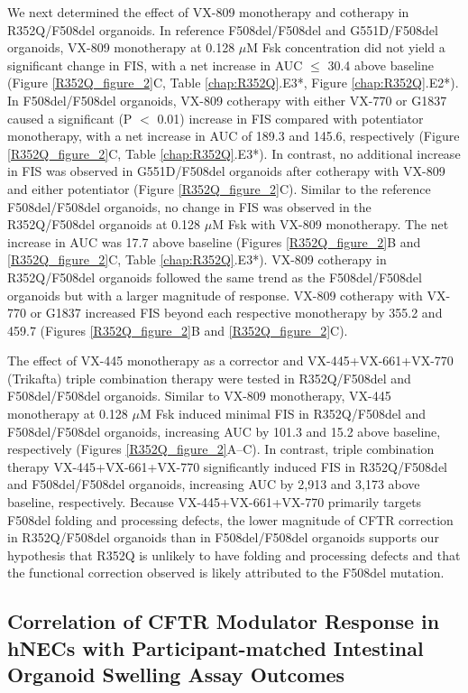 We next determined the effect of VX-809 monotherapy and cotherapy in R352Q/F508del organoids. In reference F508del/F508del and G551D/F508del organoids, VX-809 monotherapy at 0.128 $\mu$M Fsk concentration did not yield a significant change in FIS, with a net increase in AUC $\leq$ 30.4 above baseline (Figure \ref{R352Q_figure_2}C, Table \ref{chap:R352Q}.E3*, Figure \ref{chap:R352Q}.E2*). In F508del/F508del organoids, VX-809 cotherapy with either VX-770 or G1837 caused a significant (P $<$ 0.01) increase in FIS compared with potentiator monotherapy, with a net increase in AUC of 189.3 and 145.6, respectively (Figure \ref{R352Q_figure_2}C, Table \ref{chap:R352Q}.E3*). In contrast, no additional increase in FIS was observed in G551D/F508del organoids after cotherapy with VX-809 and either potentiator (Figure \ref{R352Q_figure_2}C). Similar to the reference F508del/F508del organoids, no change in FIS was observed in the R352Q/F508del organoids at 0.128 $\mu$M Fsk with VX-809 monotherapy. The net increase in AUC was 17.7 above baseline (Figures \ref{R352Q_figure_2}B and \ref{R352Q_figure_2}C, Table \ref{chap:R352Q}.E3*). VX-809 cotherapy in R352Q/F508del organoids followed the same trend as the F508del/F508del organoids but with a larger magnitude of response. VX-809 cotherapy with VX-770 or G1837 increased FIS beyond each respective monotherapy by 355.2 and 459.7 (Figures \ref{R352Q_figure_2}B and \ref{R352Q_figure_2}C).

The effect of VX-445 monotherapy as a corrector and VX-445+VX-661+VX-770 (Trikafta) triple combination therapy were tested in R352Q/F508del and F508del/F508del organoids. Similar to VX-809 monotherapy, VX-445 monotherapy at 0.128 $\mu$M Fsk induced minimal FIS in R352Q/F508del and F508del/F508del organoids, increasing AUC by 101.3 and 15.2 above baseline, respectively (Figures \ref{R352Q_figure_2}A–C). In contrast, triple combination therapy VX-445+VX-661+VX-770 significantly induced FIS in R352Q/F508del and F508del/F508del organoids, increasing AUC by 2,913 and 3,173 above baseline, respectively. Because VX-445+VX-661+VX-770 primarily targets F508del folding and processing defects, the lower magnitude of CFTR correction in R352Q/F508del organoids than in F508del/F508del organoids supports our hypothesis that R352Q is unlikely to have folding and processing defects and that the functional correction observed is likely attributed to the F508del mutation.

\subsection{Correlation of CFTR Modulator Response in hNECs with Participant-matched Intestinal Organoid Swelling Assay Outcomes}

